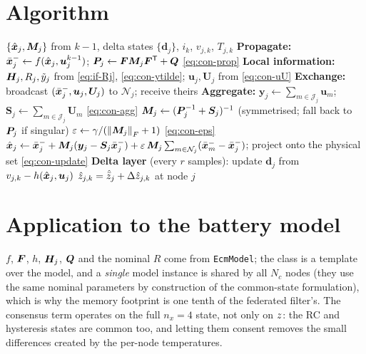 \section{Algorithm}
\begin{algorithm}[H]
\caption{Consensus (KCF) --- one sampling period $k$, executed at every node in parallel}
\begin{algorithmic}[1]
\Require $\{\hat{\bm{x}}_j,\bm{M}_j\}$ from $k-1$, delta states $\{\bm{d}_j\}$, $i_k$, $v_{j,k}$, $T_{j,k}$
\State \textbf{Propagate:} $\bar{\bm{x}}_j^-\gets f(\hat{\bm{x}}_j,\bm{u}_j^{k-1})$;\;
       $\bm{P}_j\gets\bm{F}\bm{M}_j\bm{F}^{\mathsf{T}}+\bm{Q}$ \hfill \eqref{eq:con-prop}
\State \textbf{Local information:} $\bm{H}_j,R_j,\tilde y_j$ from \eqref{eq:if-Rj}, \eqref{eq:con-ytilde};\;
       $\bm{u}_j,\bm{U}_j$ from \eqref{eq:con-uU}
\State \textbf{Exchange:} broadcast $(\bar{\bm{x}}_j^-,\bm{u}_j,\bm{U}_j)$ to $\mathcal{N}_j$; receive theirs
\State \textbf{Aggregate:} $\bm{y}_j\gets\sum_{m\in\mathcal{J}_j}\bm{u}_m$;\;
       $\bm{S}_j\gets\sum_{m\in\mathcal{J}_j}\bm{U}_m$ \hfill \eqref{eq:con-agg}
\State $\bm{M}_j\gets(\bm{P}_j^{-1}+\bm{S}_j)^{-1}$ (symmetrised; fall back to $\bm{P}_j$ if singular)
\State $\varepsilon\gets\gamma/(\left\lVert \bm{M}_j \right\rVert_F+1)$ \hfill \eqref{eq:con-eps}
\State $\hat{\bm{x}}_j\gets\bar{\bm{x}}_j^- + \bm{M}_j(\bm{y}_j-\bm{S}_j\bar{\bm{x}}_j^-)
        + \varepsilon\,\bm{M}_j\sum_{m\in\mathcal{N}_j}(\bar{\bm{x}}_m^- - \bar{\bm{x}}_j^-)$;\;
       project onto the physical set \hfill \eqref{eq:con-update}
\State \textbf{Delta layer} (every $r$ samples): update $\bm{d}_j$ from $v_{j,k}-h(\hat{\bm{x}}_j,\bm{u}_j)$
\Ensure $\hat{z}_{j,k}=\hat{\bar{z}}_j+\Delta\hat{z}_{j,k}$ at node $j$
\end{algorithmic}
\end{algorithm}

\section{Application to the battery model}
$f$, $\bm{F}$, $h$, $\bm{H}_j$, $\bm{Q}$ and the nominal $R$ come from \texttt{EcmModel}; the class is a
template over the model, and a \emph{single} model instance is shared by all $N_c$ nodes (they use
the same nominal parameters by construction of the common-state formulation), which is why the
memory footprint is one tenth of the federated filter's. The consensus term operates on the full
$n_x=4$ state, not only on $z$: the RC and hysteresis states are common too, and letting them
consent removes the small differences created by the per-node temperatures.

